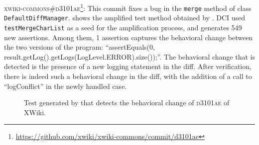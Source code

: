 \textsc{xwiki-commons\#d3101ae}\footnote{\url{https://github.com/xwiki/xwiki-commons/commit/d3101ae}}: This commit fixes a bug in the \texttt{merge} method of class \texttt{DefaultDiffManager}.
 shows the amplified test method obtained by \DCIA.
DCI used \texttt{testMergeCharList} as a seed for the amplification process, and generates 549 new assertions.
Among them, 1 assertion captures the behavioral change between the two versions of the program: 
``assertEquals(0, result.getLog().getLogs(LogLevel.ERROR).size());''.
The behavioral change that is detected is the presence of a new logging statement in the diff. After verification, there is indeed such a behavioral change in the diff, with the addition of a call to ``logConflict'' in the newly handled case.

\begin{figure}[h]
\centering
{}
\caption{Test generated by \DCIA that detects the behavioral change of \textsc{d3101ae} of XWiki.}
\label{fig:ampl_xwiki}
\end{figure}

